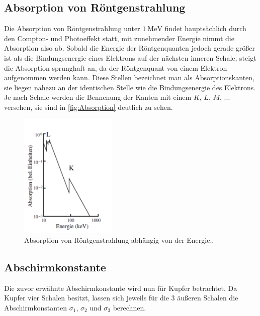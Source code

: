 \subsection{Absorption von Röntgenstrahlung}
\label{sec:Absorption von Röntgenstrahlung}

Die Absorption von Röntgenstrahlung unter $\qty{1}{\mega\electronvolt}$ findet hauptsächlich durch den Compton- und
Photoeffekt statt, mit zunehmender Energie nimmt die Absorption also ab. Sobald die Energie der Röntgenquanten jedoch
gerade größer ist als die Bindungsenergie eines Elektrons auf der nächsten inneren Schale, steigt die Absorption sprunghaft an,
da der Röntgenquant von einem Elektron aufgenommen werden kann.
Diese Stellen bezeichnet man als Absorptionskanten, sie liegen nahezu an der identischen Stelle wie die Bindungsenergie
des Elektrons. Je nach Schale werden die Bennenung der Kanten mit einem $K$, $L$, $M$, ... versehen, sie sind in
\autoref{fig:Absorption} deutlich zu sehen.

\begin{figure}[H]
    \centering
    \includegraphics[height=6cm]{content/pics/absorption.pdf}
    \caption{Absorption von Röntgenstrahlung abhängig von der Energie..\cite{v602}}
    \label{fig:Absorption}
\end{figure}

\subsection{Abschirmkonstante}
\label{sec:Abschirmkonstante}

Die zuvor erwähnte Abschirmkonstante wird nun für Kupfer betrachtet.
Da Kupfer vier Schalen besitzt, lassen sich jeweils für die 3 äußeren Schalen die Abschirmkonstanten
$\sigma_1$, $\sigma_2$ und $\sigma_3$ berechnen.

